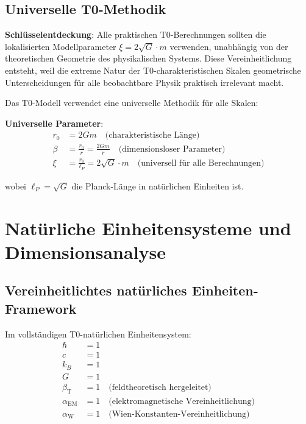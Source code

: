 \documentclass[12pt,a4paper]{article}
\newcommand{\betaT}{\beta_{\text{T}}}
\newcommand{\alphaEM}{\alpha_{\text{EM}}}
\newcommand{\alphaW}{\alpha_{\text{W}}}
\begin{document}
	\subsection{Universelle T0-Methodik}
	\label{subsec:universelle_methodik}
	
	\begin{tcolorbox}[colback=orange!5!white,colframe=orange!75!black,title=Universelle T0-Berechnungsmethode]
		\textbf{Schlüsselentdeckung}: Alle praktischen T0-Berechnungen sollten die lokalisierten Modellparameter $\xi = 2\sqrt{G} \cdot m$ verwenden, unabhängig von der theoretischen Geometrie des physikalischen Systems. Diese Vereinheitlichung entsteht, weil die extreme Natur der T0-charakteristischen Skalen geometrische Unterscheidungen für alle beobachtbare Physik praktisch irrelevant macht.
	\end{tcolorbox}
	
	Das T0-Modell verwendet eine universelle Methodik für alle Skalen:
	
	\textbf{Universelle Parameter}:
	\begin{align}
		r_0 &= 2Gm \quad \text{(charakteristische Länge)} \\
		\beta &= \frac{r_0}{r} = \frac{2Gm}{r} \quad \text{(dimensionsloser Parameter)} \\
		\xi &= \frac{r_0}{\ell_P} = 2\sqrt{G} \cdot m \quad \text{(universell für alle Berechnungen)}
	\end{align}
	
	wobei $\ell_P = \sqrt{G}$ die Planck-Länge in natürlichen Einheiten ist.
	
	\section{Natürliche Einheitensysteme und Dimensionsanalyse}
	\label{sec:natuerliche_einheiten}
	
	\subsection{Vereinheitlichtes natürliches Einheiten-Framework}
	\label{subsec:vereinheitlichtes_framework}
	
	Im vollständigen T0-natürlichen Einheitensystem:
	\begin{align}
		\hbar &= 1 \\
		c &= 1 \\
		k_B &= 1 \\
		G &= 1 \\
		\betaT &= 1 \quad \text{(feldtheoretisch hergeleitet)} \\
		\alphaEM &= 1 \quad \text{(elektromagnetische Vereinheitlichung)} \\
		\alphaW &= 1 \quad \text{(Wien-Konstanten-Vereinheitlichung)}
	\end{align}
	
\end{document}
